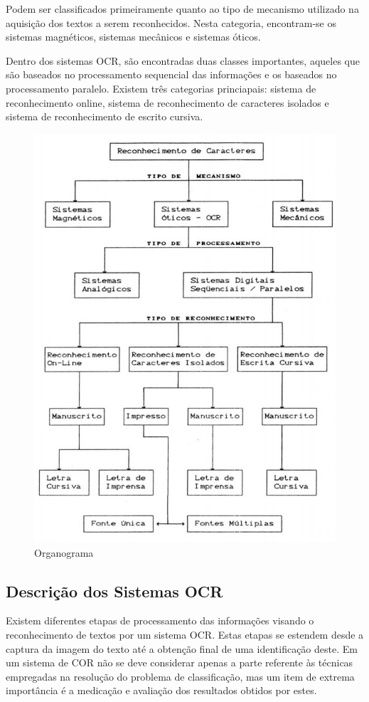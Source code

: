 	Podem ser classificados primeiramente quanto ao tipo de mecanismo utilizado na aquisição dos textos a serem reconhecidos. Nesta categoria, encontram-se os sistemas magnéticos, sistemas mecânicos e sistemas óticos.
	
	Dentro dos sistemas OCR, são encontradas duas classes importantes, aqueles que são baseados no processamento sequencial das informações e os baseados no processamento paralelo. Existem três categorias princiapais: sistema de reconhecimento online, sistema de reconhecimento de caracteres isolados e sistema de reconhecimento de escrito cursiva.
	
	\begin{figure}[!htb]
		\centering
		\includegraphics[scale=0.4]{img/organograma-tipos.jpg}
		\caption{Organograma}
		\label{Organograma}
	\end{figure}
	
	\subsection{Descrição dos Sistemas OCR}
	Existem diferentes etapas de processamento das informações visando o reconhecimento de textos por um sistema OCR. Estas etapas se estendem desde a captura da imagem do texto até a obtenção final de uma identificação deste. Em um sistema de COR não se deve considerar apenas a parte referente às técnicas empregadas na resolução do problema de classificação, mas um item de extrema importância é a medicação e avaliação dos resultados obtidos por estes.
